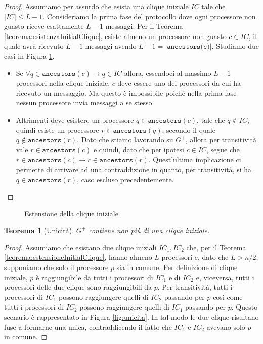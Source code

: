 \documentclass{article}
\newtheorem{teorema}{Teorema}
\begin{document}
\begin{proof}
  Assumiamo per assurdo che esista una clique iniziale $IC$ tale che
  $|IC|\leq L-1$.  Consideriamo la prima fase del protocollo dove ogni
  processore non guasto riceve esattamente $L-1$ messaggi. Per il
  Teorema \ref{teorema:esistenzaInitialClique}, esiste almeno un
  processore non guasto $c \in IC$, il quale avrà ricevuto $L-1$
  messaggi avendo $L-1 = |\texttt{ancestors(c)}|$. Studiamo due casi
  in Figura \ref{fig:estensione}.
  \begin{itemize}
  \item Se $\forall q \in \texttt{ancestors}(c) \rightarrow q \in IC$
    allora, essendoci al massimo $L-1$ processori nella clique
    iniziale, $c$ deve essere uno dei processori da cui ha ricevuto un
    messaggio. Ma questo è impossibile poiché nella prima fase nessun
    processore invia messaggi a se stesso.
  \item Altrimenti deve esistere un processore $q \in
    \texttt{ancestors}(c)$, tale che $q \not \in IC$, quindi esiste un
    processore $r \in \texttt{ancestors} (q)$, secondo il quale $q \not \in
    \texttt{ancestors} (r)$. Dato che stiamo lavorando su $G^+$,
    allora per transitività vale $r \in \texttt{ancestors} (c)$ e
    quindi, dato che per ipotesi $c \in IC$, segue che $r \in
    \texttt{ancestors} (c) \rightarrow c \in \texttt{ancestors}
    (r)$. Quest'ultima implicazione ci permette di arrivare ad una
    contraddizione in quanto, per transitività, si ha $q \in
    \texttt{ancestors}(r)$, caso escluso precedentemente.
  \end{itemize}
\end{proof}
\begin{figure}[!h]
  \centering \caption{Estensione della
    clique iniziale.}\label{fig:estensione}
\end{figure}

\begin{teorema}[Unicità]
  \label{teorema:unicitaInitialClique}
  $G^+$ contiene non più di una clique iniziale.\end{teorema}
\begin{proof}
  Assumiamo che esistano due clique iniziali $IC_1, IC_2$ che, per il
  Teorema \ref{teorema:estensioneInitialClique}, hanno almeno $L$
  processori e, dato che $L>n/2$, supponiamo che solo il processore
  $p$ sia in comune. Per definizione di clique iniziale, $p$ è
  raggiungibile da tutti i processori di $IC_1$ e di $IC_2$ e,
  viceversa, tutti i processori delle due clique sono raggiungibili da
  $p$. Per transitività, tutti i processori di $IC_1$ possono
  raggiungere quelli di $IC_2$ passando per $p$ così come tutti i
  processori di $IC_2$ possono raggiungere quelli di $IC_1$ passando
  per $p$. Questo scenario è rappresentato in Figura
  \ref{fig:unicita}. In tal modo le due clique risultano fuse a
  formarne una unica, contraddicendo il fatto che $IC_1$ e $IC_2$
  avevano solo $p$ in comune.
\end{proof}
\end{document}
